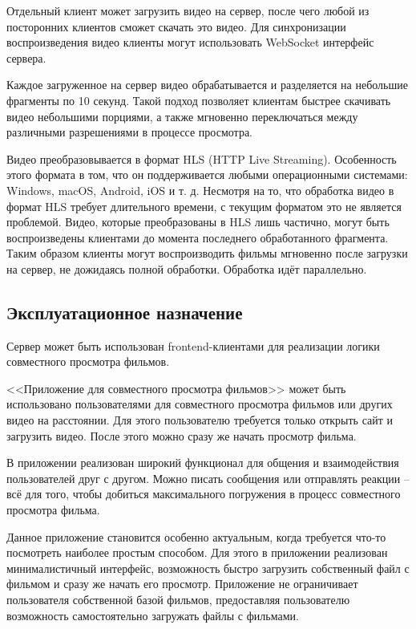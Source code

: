 \documentclass{../includes/TechDoc}
\begin{document}
    Отдельный клиент может загрузить видео на сервер, после чего любой из посторонних клиентов сможет скачать это видео.
    Для синхронизации воспроизведения видео клиенты могут использовать WebSocket интерфейс сервера.

    Каждое загруженное на сервер видео обрабатывается и разделяется на небольшие фрагменты по 10 секунд.
    Такой подход позволяет клиентам быстрее скачивать видео небольшими порциями, а также мгновенно переключаться между различными разрешениями в процессе просмотра.

    Видео преобразовывается в формат HLS (HTTP Live Streaming).
    Особенность этого формата в том, что он поддерживается любыми операционными системами: Windows, macOS, Android, iOS и т. д.
    Несмотря на то, что обработка видео в формат HLS требует длительного времени, с текущим форматом это не является проблемой.
    Видео, которые преобразованы в HLS лишь частично, могут быть воспроизведены клиентами до момента последнего обработанного фрагмента.
    Таким образом клиенты могут воспроизводить фильмы мгновенно после загрузки на сервер, не дожидаясь полной обработки.
    Обработка идёт параллельно.

    \subsection{Эксплуатационное назначение}

    Сервер может быть использован frontend-клиентами для реализации логики совместного просмотра фильмов.

    <<Приложение для совместного просмотра фильмов>> может быть использовано пользователями для совместного просмотра фильмов или других видео на расстоянии.
    Для этого пользователю требуется только открыть сайт и загрузить видео.
    После этого можно сразу же начать просмотр фильма.

    В приложении реализован широкий функционал для общения и взаимодействия пользователей друг с другом.
    Можно писать сообщения или отправлять реакции -- всё для того, чтобы добиться максимального погружения в процесс совместного просмотра фильма.

    Данное приложение становится особенно актуальным, когда требуется что-то посмотреть наиболее простым способом.
    Для этого в приложении реализован минималистичный интерфейс, возможность быстро загрузить собственный файл с фильмом и сразу же начать его просмотр.
    Приложение не ограничивает пользователя собственной базой фильмов, предоставляя пользователю возможность самостоятельно загружать файлы с фильмами.
\end{document}
